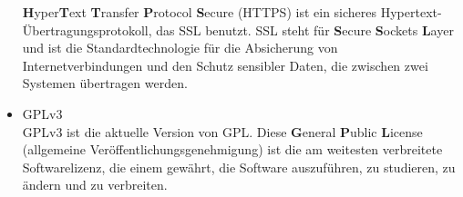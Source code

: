 \documentclass[12 pt]{article}
\begin{document}
\begin{itemize}
		\textbf{H}yper\textbf{T}ext \textbf{T}ransfer \textbf{P}rotocol \textbf{S}ecure (HTTPS) ist ein sicheres Hypertext-Übertragungsprotokoll, das SSL benutzt.
		SSL steht für \textbf{S}ecure \textbf{S}ockets \textbf{L}ayer und ist die Standardtechnologie für die Absicherung von Internetverbindungen und den Schutz sensibler Daten, die zwischen zwei Systemen übertragen werden.
		\item GPLv3 \\
		GPLv3 ist die aktuelle Version von GPL. Diese \textbf{G}eneral \textbf{P}ublic \textbf{L}icense (allgemeine Veröffentlichungsgenehmigung) ist die am weitesten verbreitete Softwarelizenz,
		die einem gewährt, die Software auszuführen, zu studieren, zu ändern und zu verbreiten.
	\end{itemize}
	
	
\end{document}
